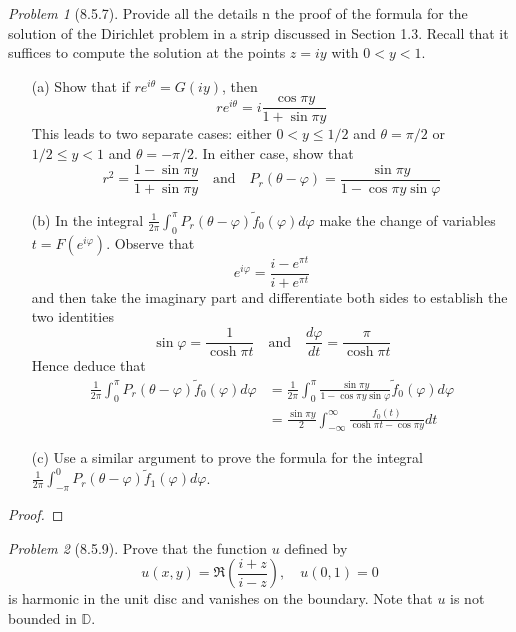 \documentclass[10pt]{article}
\newcommand{\sk}{\vskip 6mm}
\newcommand{\bb}[1]{\mathbb{#1}}
\newcommand{\wt}[1]{\widetilde{#1}}
\theoremstyle{remark}
\newtheorem{problem}{Problem}
\theoremstyle{remark}
\begin{document}
\begin{problem}[8.5.7]
  Provide all the details n the proof of the formula for the solution of the Dirichlet problem in a strip discussed in Section 1.3. Recall that it suffices to compute the solution at the points $z=iy$ with $0<y<1$.
  \begin{enumerate}
  \item[(a)] Show that if $re^{i\theta}=G(iy)$, then
    \[
      re^{i\theta}=i\frac{\cos\pi y}{1+\sin\pi y}
    \]
    This leads to two separate cases: either $0<y\leq 1/2$ and $\theta=\pi/2$ or $1/2\leq y<1$ and $\theta=-\pi/2$. In either case, show that
    \[
      r^2=\frac{1-\sin\pi y}{1+\sin\pi y}\quad \text{and}\quad P_r(\theta-\varphi)=\frac{\sin\pi y}{1-\cos\pi y\sin\varphi}
    \]
  \item[(b)] In the integral $\frac{1}{2\pi}\int_0^\pi P_r(\theta-\varphi)\wt{f}_0(\varphi)d\varphi$ make the change of variables $t=F(e^{i\varphi})$. Observe that
    \[
      e^{i\varphi}=\frac{i-e^{\pi t}}{i+e^{\pi t}}
    \]
    and then take the imaginary part and differentiate both sides to establish the two identities
    \[
      \sin\varphi = \frac{1}{\cosh \pi t}\quad \text{and}\quad \frac{d\varphi}{dt}=\frac{\pi}{\cosh\pi t}
    \]
    Hence deduce that
    \begin{align*}
      \frac{1}{2\pi}\int_0^\pi P_r(\theta-\varphi)\wt{f}_0(\varphi)d\varphi &=\frac{1}{2\pi}\int_0^\pi\frac{\sin\pi y}{1-\cos\pi y\sin\varphi}\wt{f}_0(\varphi)d\varphi\\
                                             &=\frac{\sin\pi y}{2}\int_{-\infty}^\infty\frac{f_0(t)}{\cosh\pi t-\cos\pi y}dt
    \end{align*}
  \item[(c)] Use a similar argument to prove the formula for the integral $\frac{1}{2\pi}\int_{-\pi}^0 P_r(\theta-\varphi)\wt{f}_1(\varphi)d\varphi$.
  \end{enumerate}
\end{problem}

\begin{proof}
  
\end{proof}

\sk

\begin{problem}[8.5.9]
  Prove that the function $u$ defined by
  \[
    u(x,y)=\Re(\frac{i+z}{i-z}),\quad u(0,1)=0
  \]
  is harmonic in the unit disc and vanishes on the boundary. Note that $u$ is not bounded in $\bb{D}$.
\end{problem}
\end{document}
